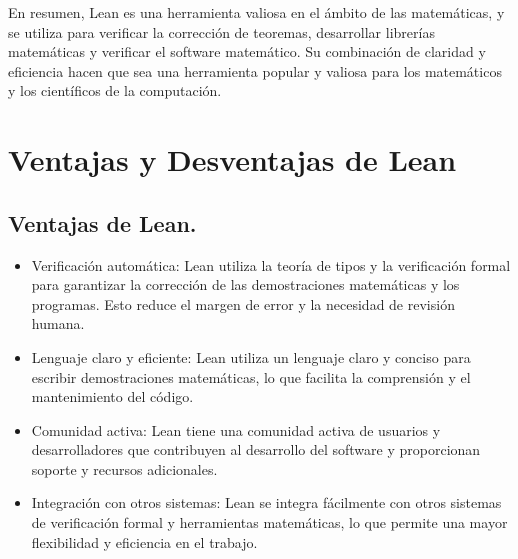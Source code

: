 \documentclass{article}
\begin{document}
En resumen, Lean es una herramienta valiosa en el ámbito de las
matemáticas, y se utiliza para verificar la corrección de teoremas,
desarrollar librerías matemáticas y verificar el software matemático. Su
combinación de claridad y eficiencia hacen que sea una herramienta popular
y valiosa para los matemáticos y los científicos de la computación.

\section{Ventajas y Desventajas de Lean}
\subsection{Ventajas de Lean.}
\begin{itemize}
	\item Verificación automática: Lean utiliza la teoría de tipos y la
	      verificación formal para garantizar la corrección de las
	      demostraciones matemáticas y los programas. Esto reduce el margen de
	      error y la necesidad de revisión humana.

	\item Lenguaje claro y eficiente: Lean utiliza un lenguaje claro y
	      conciso para escribir demostraciones matemáticas, lo que facilita la
	      comprensión y el mantenimiento del código.

	\item Comunidad activa: Lean tiene una comunidad activa de usuarios y
	      desarrolladores que contribuyen al desarrollo del software y
	      proporcionan soporte y recursos adicionales.

	\item Integración con otros sistemas: Lean se integra fácilmente con
	      otros sistemas de verificación formal y herramientas matemáticas, lo
	      que permite una mayor flexibilidad y eficiencia en el trabajo.

\end{itemize}
\end{document}
